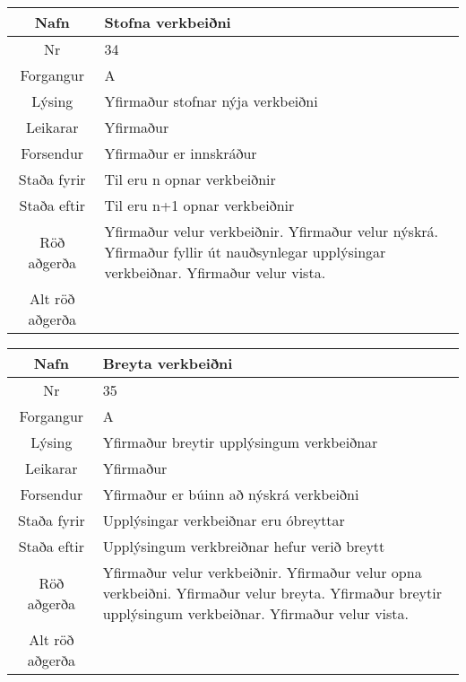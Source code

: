 \begin{table}[h!]\centering
\begin{tabular}{|c|p{10cm}|}
\hline
Nafn&Stofna verkbeiðni\\
\hline
Nr&34\\
\hline
Forgangur&A\\
\hline
Lýsing&Yfirmaður stofnar nýja verkbeiðni\\
\hline
Leikarar&Yfirmaður\\
\hline
Forsendur&Yfirmaður er innskráður\\
\hline
Staða fyrir&Til eru n opnar verkbeiðnir\\
\hline
Staða eftir&Til eru n+1 opnar verkbeiðnir\\
\hline
Röð aðgerða&Yfirmaður velur verkbeiðnir. Yfirmaður velur nýskrá. Yfirmaður fyllir út nauðsynlegar upplýsingar verkbeiðnar. Yfirmaður velur vista.\\
\hline
Alt röð aðgerða&\\
\hline
\end{tabular}
\end{table}
\caption{Use case 34}\label{tab:use_case_34}
\begin{table}[h!]\centering
\begin{tabular}{|c|p{10cm}|}
\hline
Nafn&Breyta verkbeiðni\\
\hline
Nr&35\\
\hline
Forgangur&A\\
\hline
Lýsing&Yfirmaður breytir upplýsingum verkbeiðnar\\
\hline
Leikarar&Yfirmaður\\
\hline
Forsendur&Yfirmaður er búinn að nýskrá verkbeiðni\\
\hline
Staða fyrir&Upplýsingar verkbeiðnar eru óbreyttar\\
\hline
Staða eftir&Upplýsingum verkbreiðnar hefur verið breytt\\
\hline
Röð aðgerða&Yfirmaður velur verkbeiðnir. Yfirmaður velur opna verkbeiðni. Yfirmaður velur breyta. Yfirmaður breytir upplýsingum verkbeiðnar. Yfirmaður velur vista.\\
\hline
Alt röð aðgerða&\\
\hline
\end{tabular}
\end{table}
\caption{Use case 35}\label{tab:use_case_35}
